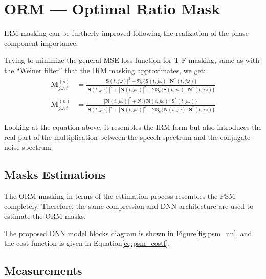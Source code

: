 \section{ORM --- Optimal Ratio Mask}
IRM masking can be furtherly improved following the
realization of the phase component importance. 


Trying to minimize the general MSE loss function for T-F masking,
same as with the ``Weiner filter'' that the IRM masking approximates, 
we get\cite{Xia2017UsingOR}:
\begin{align}
    \mathbf{M}^{(s)}_{j\omega, t} & = \frac{
        |\mathbf{S}(t,j\omega)|^{2}
        + \mathfrak{R}_{e}\{ \mathbf{S}(t,j\omega) \cdot {\mathbf{N}}^{*}(t,j\omega) \}
        }{
            |\mathbf{S}(t,j\omega)|^{2} 
            + |\mathbf{N}(t,j\omega)|^{2}
            + 2 \mathfrak{R}_{e}\{ \mathbf{S}(t,j\omega) \cdot {\mathbf{N}}^{*}(t,j\omega) \} 
        } \\
    \mathbf{M}^{(n)}_{j\omega, t} & = \frac{
        |\mathbf{N}(t,j\omega)|^{2}
        + \mathfrak{R}_{e}\{ \mathbf{N}(t,j\omega) \cdot {\mathbf{S}}^{*}(t,j\omega) \}
        }{
            |\mathbf{S}(t,j\omega)|^{2} 
            + |\mathbf{N}(t,j\omega)|^{2}
            + 2 \mathfrak{R}_{e}\{ \mathbf{N}(t,j\omega) \cdot {\mathbf{S}}^{*}(t,j\omega) \} 
        }
\end{align}

Looking at the equation above, 
it resembles the IRM form but also introduces
the real part of the multiplication between the speech spectrum
and the conjugate noise spectrum.

\subsection{Masks Estimations}
The ORM masking in terms of the estimation process resembles the
PSM completely. Therefore, the same compression and 
DNN architecture are used to estimate the ORM masks.

The proposed DNN model blocks diagram is shown in Figure\;\ref{fig:psm_nn},
and the cost function is given in Equation\;\ref{eq:psm_costf}.

\subsection{Measurements}


